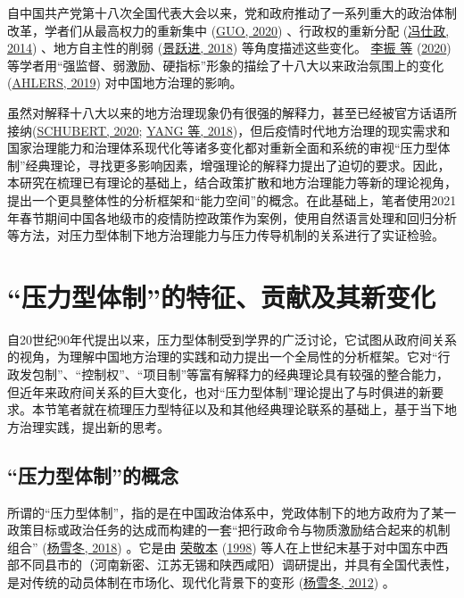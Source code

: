 \documentclass[
  12pt,
]{ctexart}
\begin{document}
自中国共产党第十八次全国代表大会以来，党和政府推动了一系列重大的政治体制改革，学者们从最高权力的重新集中 (\protect\hyperlink{ref-Guo2020}{GUO, 2020}) 、行政权的重新分配 (\protect\hyperlink{ref-FengShiZheng2014}{冯仕政, 2014}) 、地方自主性的削弱 (\protect\hyperlink{ref-JingYueJin2018}{景跃进, 2018}) 等角度描述这些变化。 \protect\hyperlink{ref-LiZhenEtAl2020}{李振 等} (\protect\hyperlink{ref-LiZhenEtAl2020}{2020}) 等学者用``强监督、弱激励、硬指标''形象的描绘了十八大以来政治氛围上的变化 (\protect\hyperlink{ref-Ahlers2019}{AHLERS, 2019}) 对中国地方治理的影响。

虽然对解释十八大以来的地方治理现象仍有很强的解释力，甚至已经被官方话语所接纳(\protect\hyperlink{ref-Schubert2020}{SCHUBERT, 2020}; \protect\hyperlink{ref-YangYan2018}{YANG 等, 2018})，但后疫情时代地方治理的现实需求和国家治理能力和治理体系现代化等诸多变化都对重新全面和系统的审视``压力型体制''经典理论，寻找更多影响因素，增强理论的解释力提出了迫切的要求。因此，本研究在梳理已有理论的基础上，结合政策扩散和地方治理能力等新的理论视角，提出一个更具整体性的分析框架和``能力空间''的概念。在此基础上，笔者使用2021年春节期间中国各地级市的疫情防控政策作为案例，使用自然语言处理和回归分析等方法，对压力型体制下地方治理能力与压力传导机制的关系进行了实证检验。

\hypertarget{ux538bux529bux578bux4f53ux5236ux7684ux7279ux5f81ux8d21ux732eux53caux5176ux65b0ux53d8ux5316}{%
\section{``压力型体制''的特征、贡献及其新变化}\label{ux538bux529bux578bux4f53ux5236ux7684ux7279ux5f81ux8d21ux732eux53caux5176ux65b0ux53d8ux5316}}

自20世纪90年代提出以来，压力型体制受到学界的广泛讨论，它试图从政府间关系的视角，为理解中国地方治理的实践和动力提出一个全局性的分析框架。它对``行政发包制''、``控制权''、``项目制''等富有解释力的经典理论具有较强的整合能力，但近年来政府间关系的巨大变化，也对``压力型体制''理论提出了与时俱进的新要求。本节笔者就在梳理压力型特征以及和其他经典理论联系的基础上，基于当下地方治理实践，提出新的思考。

\hypertarget{ux538bux529bux578bux4f53ux5236ux7684ux6982ux5ff5}{%
\subsection{``压力型体制''的概念}\label{ux538bux529bux578bux4f53ux5236ux7684ux6982ux5ff5}}

所谓的``压力型体制''，指的是在中国政治体系中，党政体制下的地方政府为了某一政策目标或政治任务的达成而构建的一套``把行政命令与物质激励结合起来的机制组合'' (\protect\hyperlink{ref-YangXueDong2018}{杨雪冬, 2018}) 。它是由 \protect\hyperlink{ref-RongJingBen1998}{荣敬本} (\protect\hyperlink{ref-RongJingBen1998}{1998}) 等人在上世纪末基于对中国东中西部不同县市的（河南新密、江苏无锡和陕西咸阳）调研提出，并具有全国代表性，是对传统的动员体制在市场化、现代化背景下的变形 (\protect\hyperlink{ref-YangXueDong2012}{杨雪冬, 2012}) 。
\end{document}
